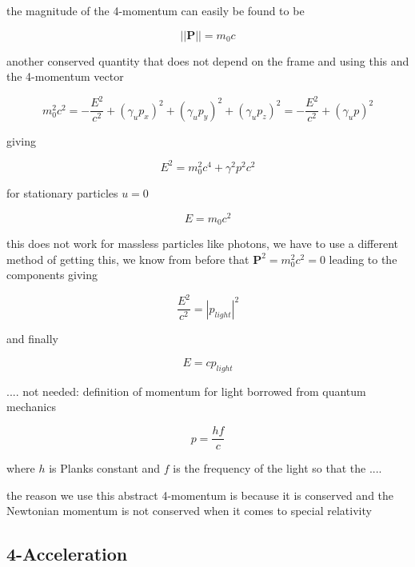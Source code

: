 the magnitude of the 4-momentum can easily be found to be

\begin{equation}
	||\mathbf{P}|| = m_0 c
\end{equation}

another conserved quantity that does not depend on the frame and using this and the 4-momentum vector

\begin{equation}
	m^2_0 c^2 = - \frac{E^2}{c^2}  + (\gamma_u p_x)^2 + (\gamma_u p_y)^2 + (\gamma_u p_z)^2 = - \frac{E^2}{c^2}  + (\gamma_u p)^2
\end{equation}

giving

\begin{equation}
	E^2 = m_0^2c^4 +\gamma^2p^2c^2
\end{equation}

for stationary particles $u=0$

\begin{equation}
	E = m_0c^2
\end{equation}

this does not work for massless particles like photons, we have to use a different method of getting this, we know from before that $ \mathbf{P}^2 = m_0^2 c^2 = 0$ leading to the components giving

\begin{equation}
	\frac{E^2}{c^2} = |p_{light}|^2
\end{equation}

and finally

\begin{equation}
	E = c p_{light}
\end{equation}

....
not needed:
definition of momentum for light borrowed from quantum mechanics

\begin{equation}
	p = \frac{hf}{c}
\end{equation}

where $h$ is Planks constant and $f$ is the frequency of the light
so that the
....

the reason we use this abstract 4-momentum is because it is conserved and the Newtonian momentum is not conserved when it comes to special relativity

\subsection{4-Acceleration}

